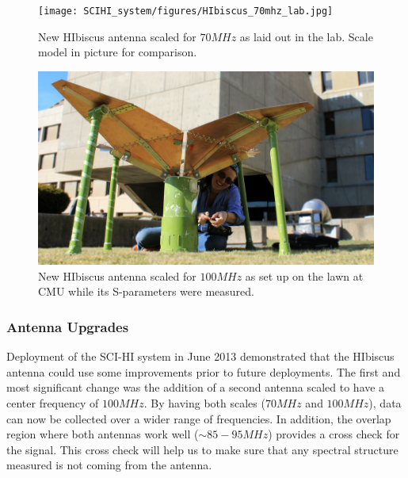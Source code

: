 \begin{figure}[htb]
\begin{center}
\texttt{[image: SCIHI\_system/figures/HIbiscus\_70mhz\_lab.jpg]}
\caption{New HIbiscus antenna scaled for $70 MHz$ as laid out in the lab. Scale model in picture for comparison.}
\label{Fig:hibiscus_70}
\end{center}
\end{figure}

\begin{figure}[htb]
\begin{center}
\includegraphics[width=0.95\linewidth]{SCIHI_system/figures/HIbiscus_100mhz.jpg}
\caption{New HIbiscus antenna scaled for $100 MHz$ as set up on the lawn at CMU while its S-parameters were measured. }
\label{Fig:hibiscus_100}
\end{center}
\end{figure}

\subsubsection{Antenna Upgrades} \label{Sec:HIant_upgrade}

Deployment of the SCI-HI system in June 2013 demonstrated that the HIbiscus antenna could use some improvements prior to future deployments. The first and most significant change was the addition of a second antenna scaled to have a center frequency of $100 MHz$. By having both scales ($70 MHz$ and $100 MHz$), data can now be collected over a wider range of frequencies. In addition, the overlap region where both antennas work well ($\sim 85-95 MHz$) provides a cross check for the signal. This cross check will help us to make sure that any spectral structure measured is not coming from the antenna. 


